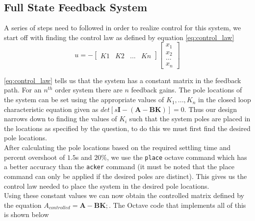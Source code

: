 \documentclass[a4paper, 12pt]{article}
\begin{document}

\subsection{Full State Feedback System} %
\label{sub:full_state_feedback_system}
A series of steps need to followed in order to realize control for this system, we start off with finding the control law as defined by equation \eqref{eq:control_law}
\begin{equation}
  u = -\left[
  \begin{array}{cccc}
    K1&K2&...&Kn
  \end{array}
  \right]
  \left[
  \begin{array}{c}
    x_1 \\
    x_2\\
    ...\\
    x_n
  \end{array}
  \right]
  \label{eq:control_law}
\end{equation}

\eqref{eq:control_law} tells us that the system has a constant matrix in the
feedback path. For an $n^{th}$ order system there are $n$ feedback gains. The
pole locations of the system can be set using the appropriate values  of $K_1,
... , K_n$ in the closed loop characteristic equation given as
$det[s\textbf{I}-(\textbf{A}-\textbf{BK})] = 0$. Thus our design narrows down
to finding the values of $K_i$ such that the system poles are placed in the
locations as specified by the question, to do this we must first find the
desired pole locations.\\

After calculating the pole locations based on the required settling time and
percent overshoot of $1.5$s and $20\%$, we use the \texttt{place} octave
command which has a better accuracy than the \texttt{acker} command (it must be
noted that the place command can only be applied if the desired poles are
distinct). This gives us the control law needed to place the system in the
desired pole locations.\\

Using these constant values we can now obtain the controlled matrix defined by
the equation $A_{controlled} = \textbf{A}-\textbf{B}\textbf{K};$. The Octave
code that implements all of this is shown below
\end{document}
